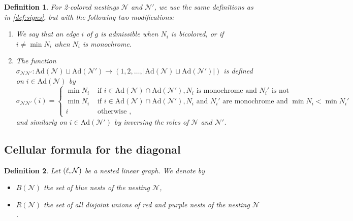 \documentclass[twoside, 12pt]{amsart}
\newtheorem{definition}{Definition}[section]
\theoremstyle{remark}
\begin{document}
\begin{definition} 
 For 2-colored nestings $\mathcal{N}$ and $\mathcal{N}'$, we use the same definitions as in \cref{def:signs}, but with the following two modifications:
\begin{enumerate}[leftmargin=*]
\item[(2)] We say that an edge $i$ of $g$ is \emph{admissible} when $N_i$ is bicolored, or if $i \neq \min N_i$ when $N_i$ is monochrome. 
\item[(4)] The function $\sigma_{\mathcal{N}\mathcal{N}'}: \mathrm{Ad}(\mathcal{N})\sqcup \mathrm{Ad}(\mathcal{N}') \to (1,2,\ldots,|\mathrm{Ad}(\mathcal{N})\sqcup \mathrm{Ad}(\mathcal{N}')|)$ is defined on $i \in \mathrm{Ad}(\mathcal{N})$ by 
\begin{equation*}
  \sigma_{\mathcal{N}\mathcal{N}'}(i)= 
  \begin{cases}
    \min N_i & \text{ if } i \in \mathrm{Ad}(\mathcal{N})\cap \mathrm{Ad}(\mathcal{N}') , N_i \text{ is monochrome and } N_i' \text{ is not} \\
    \min N_i & \text{ if } i \in \mathrm{Ad}(\mathcal{N})\cap \mathrm{Ad}(\mathcal{N}'), N_i \text{ and } N_i' \text{ are monochrome and } \min N_i < \min N_i' \\ 
    i & \text{ otherwise ,} 
  \end{cases}
\end{equation*}
and similarly on $i \in \mathrm{Ad}(\mathcal{N}')$ by inversing the roles of $\mathcal{N}$ and $\mathcal{N}'$.
\end{enumerate}
\end{definition}

\subsection{Cellular formula for the diagonal}

\begin{definition}
Let $(\ell,\mathcal{N})$ be a nested linear graph. We denote by 
\begin{itemize}[leftmargin=*]
  \item $B(\mathcal{N})$ the set of blue nests of the nesting $\mathcal{N}$,
  \item $R(\mathcal{N})$ the set of all disjoint \emph{unions} of red and purple nests of the nesting $\mathcal{N}$.
\end{itemize}
\end{definition}
\end{document}
